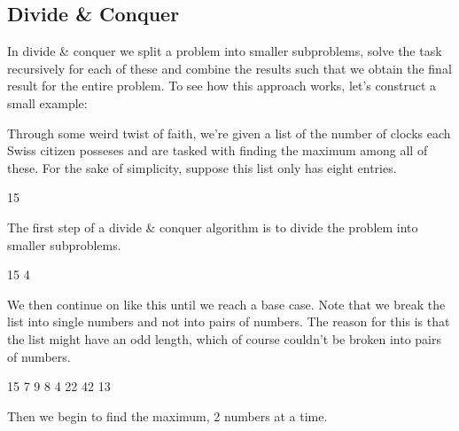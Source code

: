 \documentclass[main.tex]{subfiles}
\begin{document}
\pagebreak

\subsection{Divide \& Conquer}
In divide \& conquer we split a problem into smaller subproblems, solve the task recursively for each of these and combine the results such that we obtain the final result for the entire problem. To see how this approach works, let's construct a small example:
\begin{example}
    Through some weird twist of faith, we're given a list of the number of clocks each Swiss citizen posseses and are tasked with finding the maximum among all of these. For the sake of simplicity, suppose this list only has eight entries. 
    \begin{center}
        15
    \end{center}
    The first step of a divide \& conquer algorithm is to divide the problem into smaller subproblems.
    \begin{center}
        \hspace*{\fill} 15 \hspace*{\fill} 4 \hspace*{\fill}
    \end{center}
    We then continue on like this until we reach a base case. Note that we break the list into single numbers and not into pairs of numbers. The reason for this is that the list might have an odd length, which of course couldn't be broken into pairs of numbers.
    \begin{center}
        \hspace*{\fill} 15 \hspace*{\fill} 7 \hspace*{\fill} 9 \hspace*{\fill} 8 \hspace*{\fill} 4 \hspace*{\fill} 22 \hspace*{\fill} 42 \hspace*{\fill} 13 \hspace*{\fill}
    \end{center}
    Then we begin to find the maximum, 2 numbers at a time.

\end{example}
\end{document}
